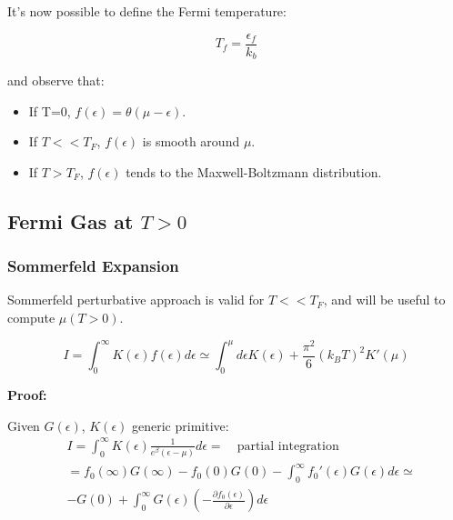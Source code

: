 \documentclass{article}
\begin{document}
It's now possible to define the Fermi temperature:

\begin{equation}
    T_f=\frac{\epsilon_f}{k_b}
\end{equation}

and observe that:

\begin{itemize}
    \item If T=0, $f(\epsilon)=\theta(\mu-\epsilon)$.
    \item If $T<<T_F$, $f(\epsilon)$ is smooth around $\mu$.
    \item If $T>T_F$, $f(\epsilon)$ tends to the Maxwell-Boltzmann distribution.
\end{itemize}

\subsection{Fermi Gas at $T>0$}
\subsubsection{Sommerfeld Expansion}

Sommerfeld perturbative approach is valid for $T<<T_F$, and will be useful to compute $\mu(T>0)$.

\begin{tcolorbox}[colframe=gray!50, colback=gray!10, coltitle=black, title=Sommerfeld expansion]

    \begin{equation}
        I=\int_{0}^{\infty}K(\epsilon)f(\epsilon)d\epsilon \simeq \int_0^\mu d\epsilon K(\epsilon)+\frac{\pi^2}{6}(k_BT)^2K'(\mu)
    \end{equation}

\end{tcolorbox}

\textbf{Proof:}

Given $G(\epsilon)$, $K(\epsilon)$ generic primitive:
\begin{equation}
    \begin{aligned}
         & I=\int_0^\infty K(\epsilon)\frac{1}{e^\beta(\epsilon-\mu)}d\epsilon= \quad \text{partial integration}   \\
         & =f_0(\infty)G(\infty)-f_0(0)G(0)-\int_0^\infty f_0'(\epsilon)G(\epsilon)d\epsilon\simeq                 \\
         & -G(0)+\int_0^\infty G(\epsilon)\left(-\frac{\partial f_0(\epsilon)}{\partial \epsilon} \right)d\epsilon
    \end{aligned}
\end{equation}
\end{document}

